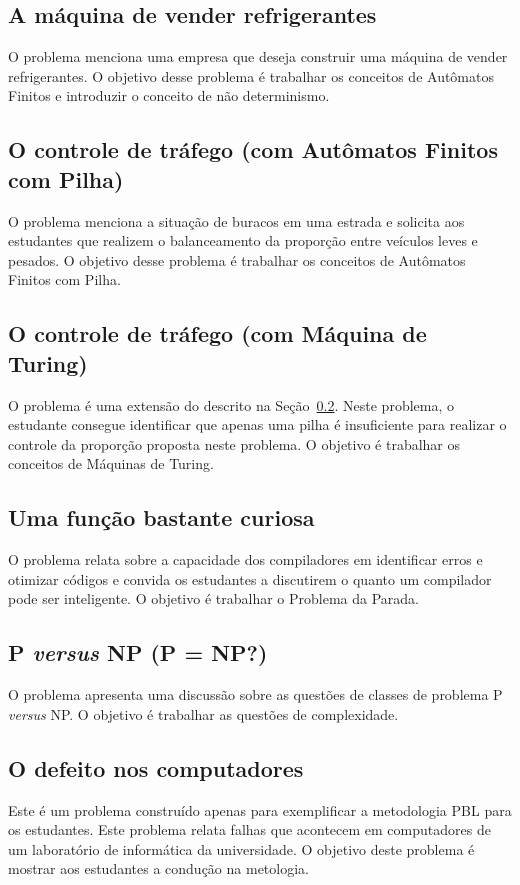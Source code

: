 \subsection{A máquina de vender refrigerantes}
O problema menciona uma empresa que deseja construir uma máquina
de vender refrigerantes.
O objetivo desse problema é trabalhar os conceitos de Autômatos
Finitos e introduzir o conceito de não determinismo.

\subsection{O controle de tráfego (com Autômatos
Finitos com Pilha)}
\label{problema3}
O problema menciona a situação de buracos em uma estrada e
solicita aos estudantes que realizem o balanceamento da proporção
entre veículos leves e pesados.
O objetivo desse problema é trabalhar os conceitos de Autômatos
Finitos com Pilha.

\subsection{O controle de tráfego (com Máquina de Turing)}
O problema é uma extensão do descrito na Seção~\ref{problema3}.
Neste problema, o estudante consegue identificar que apenas uma pilha
é insuficiente para realizar o controle da proporção proposta neste
problema.
O objetivo é trabalhar os conceitos de Máquinas de Turing.

\subsection{Uma função bastante curiosa}
O problema relata sobre a capacidade dos compiladores
em identificar erros e otimizar códigos e convida os
estudantes a discutirem o quanto um compilador
pode ser inteligente.
O objetivo é trabalhar o Problema da Parada.

\subsection{P \textit{versus} NP (P = NP?)}
O problema apresenta uma discussão sobre as questões
de classes de problema P \textit{versus} NP.
O objetivo é trabalhar as questões de complexidade.

\subsection{O defeito nos computadores}
Este é um problema construído apenas para exemplificar
a metodologia PBL para os estudantes.
Este problema relata falhas que acontecem
em computadores de um laboratório
de informática da universidade.
O objetivo deste problema é mostrar aos estudantes
a condução na metologia.

